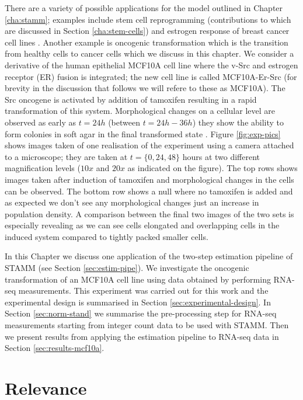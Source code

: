 There are a variety of possible applications for the model outlined in Chapter \ref{cha:stamm}; examples include stem cell reprogramming \citep{Armond:2013} (contributions to which are discussed in Section \ref{cha:stem-cells}) and estrogen response of breast cancer cell lines \citep{Casale:2013}. Another example is oncogenic transformation which is the transition from healthy cells to cancer cells which we discuss in this chapter. We consider a derivative of the human epithelial MCF10A cell line where the v-Src and estrogen receptor (ER) fusion is integrated; the new cell line is called MCF10A-Er-Src \citep{Hirsch:2010ec} (for brevity in the discussion that follows we will refere to these as MCF10A). The Src oncogene is activated by addition of tamoxifen resulting in a rapid transformation of this system. Morphological changes on a cellular level are observed as early as $t=24h$ (between $t=24h-36h$) they show the ability to form colonies in soft agar in the final transformed state \citep{Hirsch:2010ec} . Figure \ref{fig:exp-pics} shows images taken of one realisation of the experiment using a camera attached to a microscope; they are taken at $t= \lbrace 0, 24, 48 \rbrace$ hours at two different magnification levels ($10x$ and $20x$ as indicated on the figure). The top rows shows images taken after induction of tamoxifen and morphological changes in the cells can be observed. The bottom row shows a null where no tamoxifen is added and as expected we don't see any morphological changes just an increase in population density. A comparison between the final two images of the two sets is especially revealing as we can see cells elongated and overlapping cells in the induced system compared to tightly packed smaller cells.

In this Chapter we discuss one application of the two-step estimation pipeline of STAMM (see Section \ref{sec:estim-pipe}). We investigate the oncogenic transformation of an MCF10A cell line using  data obtained by performing RNA-seq measurements. This experiment was carried out for this work and the experimental design is summarised in Section \ref{sec:experimental-design}. In Section \ref{sec:norm-stand} we summarise the pre-processing step for RNA-seq measurements starting from integer count data to be used with STAMM. Then we present results from applying the estimation pipeline to RNA-seq data in Section \ref{sec:results-mcf10a}.

\section{Relevance}
\label{sec:relevance}

